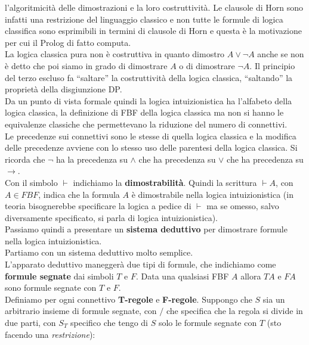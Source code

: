 \documentclass[a4paper,12pt, oneside]{book}
\begin{document}
l'algoritmicità delle dimostrazioni e la loro costruttività. Le clausole di Horn
sono infatti una restrizione del linguaggio classico e non tutte le formule di
logica classifica sono esprimibili in termini di clausole di Horn e questa è la
motivazione per cui il Prolog di fatto computa.\\
La logica classica pura non è costruttiva in quanto dimostro $A\lor \neg A$
anche se non è detto che poi siamo in grado di dimostrare $A$ o di dimostrare
$\neg A$. Il principio del terzo escluso fa ``saltare'' la costruttività della
logica classica, ``saltando'' la proprietà della disgiunzione DP.\\
Da un punto di vista formale quindi la logica intuizionistica ha l'alfabeto
della logica classica, la definizione di FBF della logica classica ma non si
hanno le equivalenze classiche che permettevano la riduzione del numero di
connettivi.\\ 
Le precedenze sui connettivi sono le stesse di quella logica classica e la
modifica delle precedenze avviene con lo stesso uso delle parentesi della logica
classica. Si ricorda che $\neg$ ha la precedenza su $\land$ che ha precedenza su
$\lor$ che ha precedenza su $\to$.\\
Con il simbolo $\vdash$ indichiamo la \textbf{dimostrabilità}. Quindi la
scrittura $\vdash A$, con $A\in FBF$, indica che la formula $A$ è dimostrabile
nella logica intuizionistica (in teoria bisognerebbe specificare la logica
a pedice di $\vdash$ ma se omesso, salvo diversamente specificato, si parla di
logica intuizionistica).\\
Passiamo quindi a presentare un \textbf{sistema deduttivo} per dimostrare
formule nella logica intuizionistica.\\
Partiamo con un sistema deduttivo molto semplice.\\
L'apparato deduttivo maneggerà due tipi di formule, che indichiamo come
\textbf{formule segnate} dai simboli $T$ e $F$. Data una qualsiasi FBF $A$
allora $TA$ e $FA$ sono formule segnate con $T$ e $F$.\\
Definiamo per ogni connettivo \textbf{T-regole} e \textbf{F-regole}. Suppongo
che $S$ sia un arbitrario insieme di formule segnate, con $/$ che specifica che
la regola si divide in due parti, con $S_T$ specifico che tengo di $S$ solo le
formule segnate con $T$ (sto facendo una \textit{restrizione}):
\end{document}
